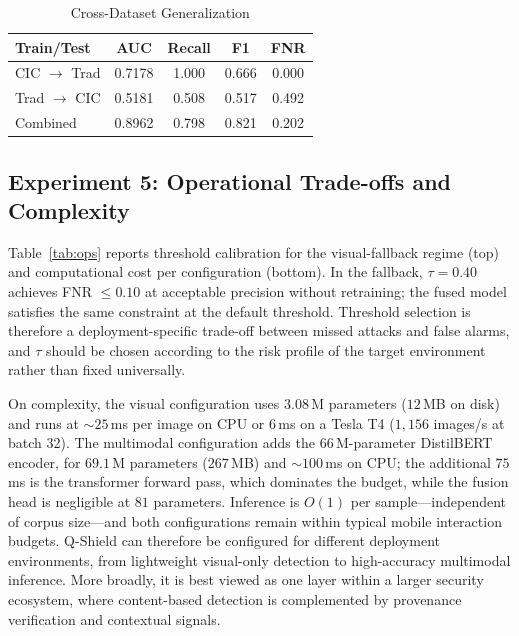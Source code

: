 \documentclass[conference]{IEEEtran}
\begin{document}
\begin{table}[!t]
\caption{Cross-Dataset Generalization}
\label{tab:cross}
\centering
\scriptsize
\begin{tabular}{lcccc}
\toprule
\textbf{Train/Test} & \textbf{AUC} & \textbf{Recall} & \textbf{F1} & \textbf{FNR} \\
\midrule
CIC $\to$ Trad & 0.7178 & 1.000 & 0.666 & 0.000 \\
Trad $\to$ CIC & 0.5181 & 0.508 & 0.517 & 0.492 \\
Combined & 0.8962 & 0.798 & 0.821 & 0.202 \\
\bottomrule
\end{tabular}
\end{table}

\subsection{Experiment 5: Operational Trade-offs and Complexity}

Table~\ref{tab:ops} reports threshold calibration for the visual-fallback regime (top) and computational cost per configuration (bottom). In the fallback, $\tau = 0.40$ achieves FNR $\leq 0.10$ at acceptable precision without retraining; the fused model satisfies the same constraint at the default threshold. Threshold selection is therefore a deployment-specific trade-off between missed attacks and false alarms, and $\tau$ should be chosen according to the risk profile of the target environment rather than fixed universally.

On complexity, the visual configuration uses $3.08$\,M parameters ($12$\,MB on disk) and runs at $\sim$$25$\,ms per image on CPU or $6$\,ms on a Tesla T4 ($1{,}156$ images/s at batch 32). The multimodal configuration adds the $66$\,M-parameter DistilBERT encoder, for $69.1$\,M parameters ($267$\,MB) and $\sim$$100$\,ms on CPU; the additional $75$\,ms is the transformer forward pass, which dominates the budget, while the fusion head is negligible at $81$ parameters. Inference is $O(1)$ per sample---independent of corpus size---and both configurations remain within typical mobile interaction budgets. Q-Shield can therefore be configured for different deployment environments, from lightweight visual-only detection to high-accuracy multimodal inference. More broadly, it is best viewed as one layer within a larger security ecosystem, where content-based detection is complemented by provenance verification and contextual signals.
\end{document}
